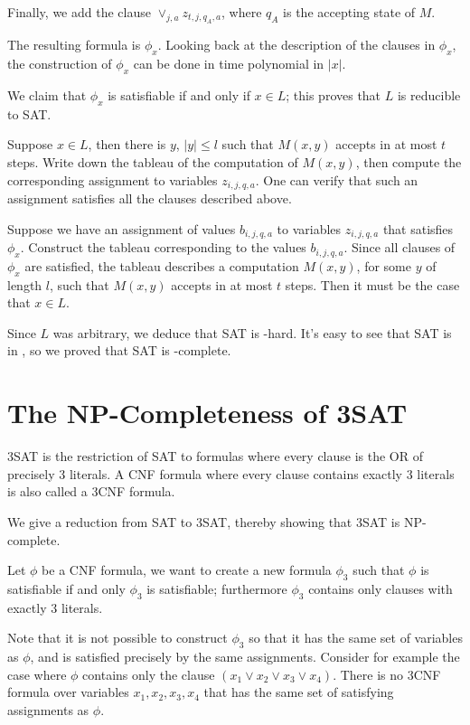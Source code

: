 Finally, we add the clause $\vee_{j,a} z_{t,j,q_A,a}$, where
$q_A$ is the accepting state of $M$.

The resulting formula is $\phi_x$. Looking back at
the description of the clauses in $\phi_x$, the construction
of $\phi_x$ can be done in time polynomial in $|x|$.



We claim that $\phi_x$ is satisfiable if and only if $x\in L$;
this proves that $L$ is reducible to SAT.

Suppose $x\in L$, then there is $y$, $|y|\leq l$ such that
$M(x,y)$ accepts in at most $t$ steps. Write down the tableau
of the computation of $M(x,y)$, then compute the corresponding
assignment to variables $z_{i,j,q,a}$. One can verify that such
an assignment satisfies all the clauses described above.

Suppose we have an assignment of values $b_{i,j,q,a}$ to
variables $z_{i,j,q,a}$ that satisfies $\phi_x$. 
Construct the tableau corresponding to the values $b_{i,j,q,a}$.
Since all clauses of $\phi_x$ are satisfied, the tableau
describes a computation $M(x,y)$, for some $y$ of length $l$,
such that $M(x,y)$ accepts in at most $t$ steps. Then
it must be the case that $x\in L$.

Since $L$ was arbitrary, we deduce that SAT is \np-hard.
It's easy to see that SAT is in \np, so we proved that
SAT is \np-complete.

\section{The NP-Completeness of 3SAT}

3SAT is the restriction of SAT to formulas where every clause
is the OR of precisely 3 literals. A CNF formula where
every clause contains exactly 3 literals is also called
a 3CNF formula.

We give a reduction from SAT to 3SAT, thereby showing that
3SAT is NP-complete.

Let $\phi$ be a CNF formula, we want to create
a new formula $\phi_3$ such that $\phi$ is satisfiable
if and only $\phi_3$ is satisfiable; furthermore $\phi_3$
contains only clauses with exactly 3 literals.

Note that it is not possible to construct $\phi_3$ so that
it has the same set of variables as $\phi$, and is satisfied
precisely by the same assignments. Consider for example
the case where $\phi$ contains only the clause $(x_1 \vee x_2
\vee x_3 \vee x_4)$. There is no 3CNF formula over variables
$x_1,x_2,x_3,x_4$ that has the same set of satisfying assignments
as $\phi$.

